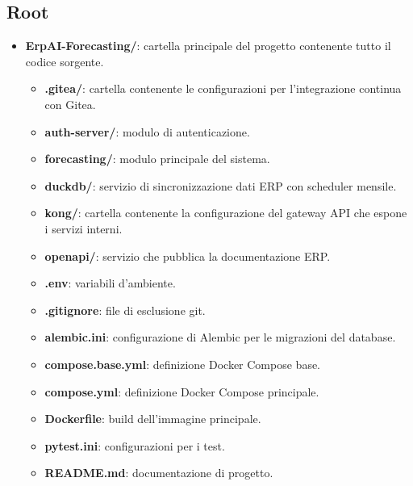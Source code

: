 \subsection{Root}
\begin{itemize}
    \item \textbf{ErpAI-Forecasting/}: cartella principale del progetto contenente tutto il codice sorgente.
    \begin{itemize}
        \item \textbf{.gitea/}: cartella contenente le configurazioni per l’integrazione continua con Gitea.
        \item \textbf{auth-server/}: modulo di autenticazione.
        \item \textbf{forecasting/}: modulo principale del sistema.
        \item \textbf{duckdb/}: servizio di sincronizzazione dati ERP con scheduler mensile.
        \item \textbf{kong/}: cartella contenente la configurazione del gateway API che espone i servizi interni.
        \item \textbf{openapi/}: servizio che pubblica la documentazione ERP.
        \item \textbf{.env}: variabili d’ambiente.
        \item \textbf{.gitignore}: file di esclusione git.
        \item \textbf{alembic.ini}: configurazione di Alembic per le migrazioni del database.
        \item \textbf{compose.base.yml}: definizione Docker Compose base.
        \item \textbf{compose.yml}: definizione Docker Compose principale.
        \item \textbf{Dockerfile}: build dell’immagine principale.
        \item \textbf{pytest.ini}: configurazioni per i test.
        \item \textbf{README.md}: documentazione di progetto.
    \end{itemize}
\end{itemize}
